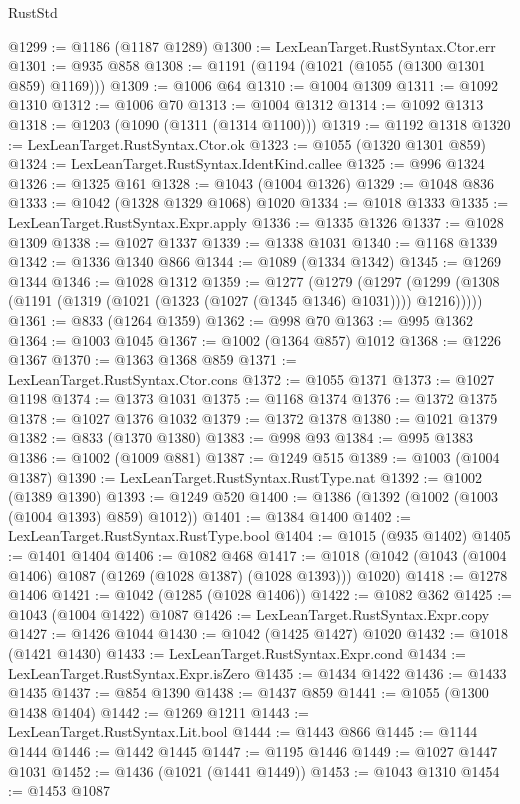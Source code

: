 \begin{lexlean}{RustStd}
\begin{coremodule}
@1299 := @1186 (@1187 @1289)
@1300 := LexLeanTarget.RustSyntax.Ctor.err
@1301 := @935 @858
@1308 := @1191 (@1194 (@1021 (@1055 (@1300 @1301 @859) @1169)))
@1309 := @1006 @64
@1310 := @1004 @1309
@1311 := @1092 @1310
@1312 := @1006 @70
@1313 := @1004 @1312
@1314 := @1092 @1313
@1318 := @1203 (@1090 (@1311 (@1314 @1100)))
@1319 := @1192 @1318
@1320 := LexLeanTarget.RustSyntax.Ctor.ok
@1323 := @1055 (@1320 @1301 @859)
@1324 := LexLeanTarget.RustSyntax.IdentKind.callee
@1325 := @996 @1324
@1326 := @1325 @161
@1328 := @1043 (@1004 @1326)
@1329 := @1048 @836
@1333 := @1042 (@1328 @1329 @1068) @1020
@1334 := @1018 @1333
@1335 := LexLeanTarget.RustSyntax.Expr.apply
@1336 := @1335 @1326
@1337 := @1028 @1309
@1338 := @1027 @1337
@1339 := @1338 @1031
@1340 := @1168 @1339
@1342 := @1336 @1340 @866
@1344 := @1089 (@1334 @1342)
@1345 := @1269 @1344
@1346 := @1028 @1312
@1359 := @1277
    (@1279
      (@1297 (@1299 (@1308 (@1191 (@1319 (@1021 (@1323 (@1027 (@1345 @1346) @1031)))) @1216)))))
@1361 := @833 (@1264 @1359)
@1362 := @998 @70
@1363 := @995 @1362
@1364 := @1003 @1045
@1367 := @1002 (@1364 @857) @1012
@1368 := @1226 @1367
@1370 := @1363 @1368 @859
@1371 := LexLeanTarget.RustSyntax.Ctor.cons
@1372 := @1055 @1371
@1373 := @1027 @1198
@1374 := @1373 @1031
@1375 := @1168 @1374
@1376 := @1372 @1375
@1378 := @1027 @1376 @1032
@1379 := @1372 @1378
@1380 := @1021 @1379
@1382 := @833 (@1370 @1380)
@1383 := @998 @93
@1384 := @995 @1383
@1386 := @1002 (@1009 @881)
@1387 := @1249 @515
@1389 := @1003 (@1004 @1387)
@1390 := LexLeanTarget.RustSyntax.RustType.nat
@1392 := @1002 (@1389 @1390)
@1393 := @1249 @520
@1400 := @1386 (@1392 (@1002 (@1003 (@1004 @1393) @859) @1012))
@1401 := @1384 @1400
@1402 := LexLeanTarget.RustSyntax.RustType.bool
@1404 := @1015 (@935 @1402)
@1405 := @1401 @1404
@1406 := @1082 @468
@1417 := @1018 (@1042 (@1043 (@1004 @1406) @1087 (@1269 (@1028 @1387) (@1028 @1393))) @1020)
@1418 := @1278 @1406
@1421 := @1042 (@1285 (@1028 @1406))
@1422 := @1082 @362
@1425 := @1043 (@1004 @1422) @1087
@1426 := LexLeanTarget.RustSyntax.Expr.copy
@1427 := @1426 @1044
@1430 := @1042 (@1425 @1427) @1020
@1432 := @1018 (@1421 @1430)
@1433 := LexLeanTarget.RustSyntax.Expr.cond
@1434 := LexLeanTarget.RustSyntax.Expr.isZero
@1435 := @1434 @1422
@1436 := @1433 @1435
@1437 := @854 @1390
@1438 := @1437 @859
@1441 := @1055 (@1300 @1438 @1404)
@1442 := @1269 @1211
@1443 := LexLeanTarget.RustSyntax.Lit.bool
@1444 := @1443 @866
@1445 := @1144 @1444
@1446 := @1442 @1445
@1447 := @1195 @1446
@1449 := @1027 @1447 @1031
@1452 := @1436 (@1021 (@1441 @1449))
@1453 := @1043 @1310
@1454 := @1453 @1087

\end{coremodule}
\end{lexlean}
